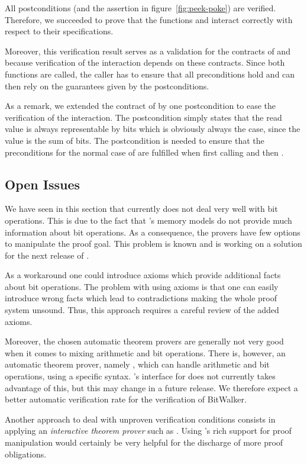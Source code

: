 All postconditions (and the assertion in figure~\ref{fig:peek-poke})
are verified. Therefore, we succeeded to prove that the 
functions \peek and \poke interact correctly
with respect to their specifications.

Moreover, this verification result serves as a validation for the contracts
of \peek and \poke because verification of the interaction 
depends on these contracts. Since both functions are called,
the caller has to ensure that all preconditions hold
and can then rely on the guarantees given by the postconditions.

As a remark, we extended the contract of \peek by one postcondition 
to ease the verification of the interaction.
The postcondition simply states that the read value is always representable 
by  bits which is obviously always the case,
since the value is the sum of  bits.
The postcondition is needed to ensure that the preconditions for the normal case
of \poke are fulfilled when first calling \peek and then \poke.

\clearpage

\subsection{Open Issues}
\label{issues}


We have seen in this section that \wpframac currently does not deal very well with bit operations.
This is due to the fact that \wpframac's memory models do not provide 
much information about bit operations.
As a consequence, the provers have few options to manipulate the proof goal.
This problem is known and \cealist is working on a solution for the next release of \wpframac.

As a workaround one could introduce axioms which provide
additional facts about bit operations. 
The problem with using axioms is that one can easily introduce wrong facts
which lead to contradictions making the whole proof system unsound. 
Thus, this approach requires a careful review of the added axioms.

Moreover, the chosen automatic theorem provers are generally not very
good when it comes to mixing arithmetic and bit operations.
There is, however, an automatic theorem prover, namely \z,
which can handle arithmetic and bit operations, using a specific syntax.
\framac's interface for \z does not currently takes advantage of this, 
but this may change in a future release.
We therefore expect a better automatic verification rate for the verification of BitWalker.

Another approach to deal with unproven verification conditions consists in
applying an \emph{interactive theorem prover} such as \coq.
Using \coq's rich support for proof manipulation would certainly be very helpful
for the discharge of more proof obligations.

